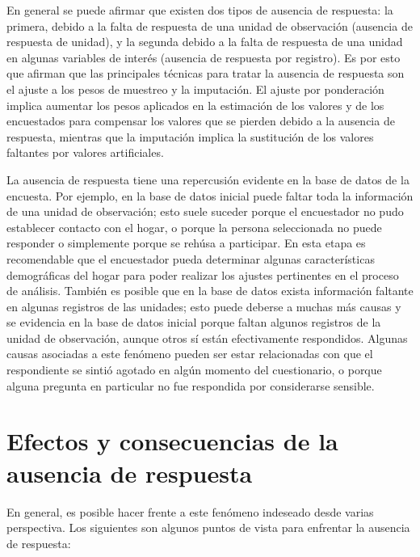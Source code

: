 \documentclass[
  12pt,
]{book}
\begin{document}
En general se puede afirmar que existen dos tipos de ausencia de respuesta: la primera, debido a la falta de respuesta de una unidad de observación (ausencia de respuesta de unidad), y la segunda debido a la falta de respuesta de una unidad en algunas variables de interés (ausencia de respuesta por registro). Es por esto que \citet[sección 15.5]{Sarndal_Swensson_Wretman_2003} afirman que las principales técnicas para tratar la ausencia de respuesta son el ajuste a los pesos de muestreo y la imputación. El ajuste por ponderación implica aumentar los pesos aplicados en la estimación de los valores y de los encuestados para compensar los valores que se pierden debido a la ausencia de respuesta, mientras que la imputación implica la sustitución de los valores faltantes por valores artificiales.

La ausencia de respuesta tiene una repercusión evidente en la base de datos de la encuesta. Por ejemplo, en la base de datos inicial puede faltar toda la información de una unidad de observación; esto suele suceder porque el encuestador no pudo establecer contacto con el hogar, o porque la persona seleccionada no puede responder o simplemente porque se rehúsa a participar. En esta etapa es recomendable que el encuestador pueda determinar algunas características demográficas del hogar para poder realizar los ajustes pertinentes en el proceso de análisis. También es posible que en la base de datos exista información faltante en algunas registros de las unidades; esto puede deberse a muchas más causas y se evidencia en la base de datos inicial porque faltan algunos registros de la unidad de observación, aunque otros sí están efectivamente respondidos. Algunas causas asociadas a este fenómeno pueden ser estar relacionadas con que el respondiente se sintió agotado en algún momento del cuestionario, o porque alguna pregunta en particular no fue respondida por considerarse sensible.

\hypertarget{efectos-y-consecuencias-de-la-ausencia-de-respuesta}{%
\section{Efectos y consecuencias de la ausencia de respuesta}\label{efectos-y-consecuencias-de-la-ausencia-de-respuesta}}

En general, es posible hacer frente a este fenómeno indeseado desde varias perspectiva. Los siguientes son algunos puntos de vista para enfrentar la ausencia de respuesta:
\end{document}

